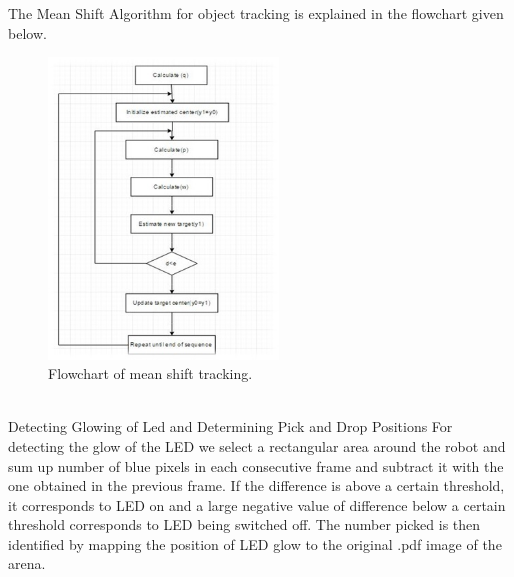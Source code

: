 \documentclass[a4paper,12pt,oneside]{book}
\begin{document}
    The Mean Shift Algorithm for object tracking is explained in the flowchart given below.\\
    \begin{figure}[h!]
		\includegraphics[width=1\linewidth, height=8cm]{fc.jpg}
		\centering
		\caption{Flowchart of mean shift tracking.}
	\end{figure}\\

Detecting Glowing of Led and Determining Pick and Drop Positions
For detecting the glow of the LED we select a rectangular area around the robot and sum up number of blue pixels in each consecutive frame and subtract it with the one obtained in the previous frame. If the difference is above a certain threshold, it corresponds to LED on and a large negative value of difference below a certain threshold corresponds to LED being switched off. The number picked is then identified by mapping the position of LED glow to the original .pdf image of the arena.  
\end{document}
